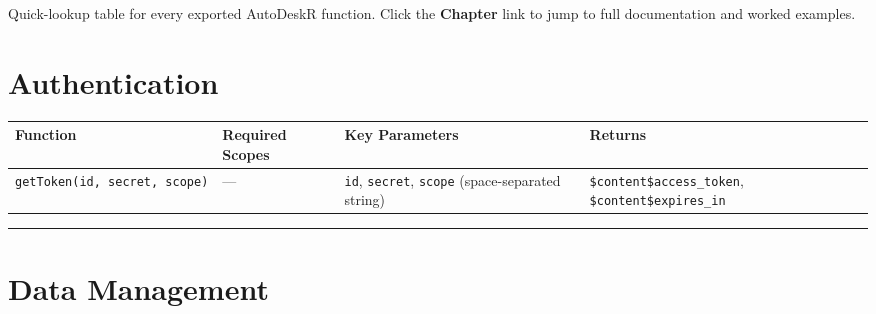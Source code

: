 \documentclass[
  11pt,
  letterpaper,
  DIV=11,
  numbers=noendperiod]{scrreprt}
\begin{document}
Quick-lookup table for every exported AutoDeskR function. Click the
\textbf{Chapter} link to jump to full documentation and worked examples.

\section{Authentication}\label{authentication-2}

\begin{longtable}[]{@{}
  >{\raggedright\arraybackslash}p{}
  >{\raggedright\arraybackslash}p{}
  >{\raggedright\arraybackslash}p{}
  >{\raggedright\arraybackslash}p{}@{}}
\toprule\noalign{}
\begin{minipage}[b]{\linewidth}\raggedright
Function
\end{minipage} & \begin{minipage}[b]{\linewidth}\raggedright
Required Scopes
\end{minipage} & \begin{minipage}[b]{\linewidth}\raggedright
Key Parameters
\end{minipage} & \begin{minipage}[b]{\linewidth}\raggedright
Returns
\end{minipage} \\
\midrule\noalign{}
\endhead
\bottomrule\noalign{}
\endlastfoot
\texttt{getToken(id,\ secret,\ scope)} & --- & \texttt{id},
\texttt{secret}, \texttt{scope} (space-separated string) &
\texttt{\$content\$access\_token}, \texttt{\$content\$expires\_in} \\
\end{longtable}

\begin{center}\rule{0.5\linewidth}{0.5pt}\end{center}

\section{Data Management}\label{data-management-1}
\end{document}
